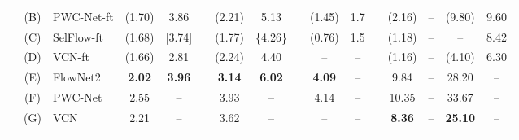 \documentclass[runningheads]{llncs}
\begin{document}
\begin{table}[t]
{\begin{tabular}{lcl cc c cc c cc c cccc}
        & \cellcolor{gray}(B) & \cellcolor{gray}PWC-Net-ft \cite{Sun2018PWCNet} & \cellcolor{gray}(1.70) & \cellcolor{gray}3.86 &\cellcolor{gray}& \cellcolor{gray}(2.21) & \cellcolor{gray}5.13 &\cellcolor{gray}& \cellcolor{gray}(1.45) & \cellcolor{gray}1.7 &\cellcolor{gray}& \cellcolor{gray}(2.16) & \cellcolor{gray}-- & \cellcolor{gray}(9.80) &\cellcolor{gray}9.60 \\
        & \cellcolor{gray}(C) & \cellcolor{gray}SelFlow-ft \cite{SelFlow} & \cellcolor{gray}(1.68) & \cellcolor{gray}[3.74] &\cellcolor{gray}& \cellcolor{gray}(1.77) & \cellcolor{gray}\{4.26\} &\cellcolor{gray}& \cellcolor{gray}(0.76) & \cellcolor{gray}1.5 &\cellcolor{gray}& \cellcolor{gray}(1.18) & \cellcolor{gray}-- & \cellcolor{gray}-- & \cellcolor{gray}8.42 \\ 
        & \cellcolor{gray}(D) & \cellcolor{gray}VCN-ft \cite{yang2019volumetric}  & \cellcolor{gray}(1.66) & \cellcolor{gray}2.81 &\cellcolor{gray}& \cellcolor{gray}(2.24) & \cellcolor{gray}4.40 &\cellcolor{gray}& \cellcolor{gray}-- & \cellcolor{gray}-- &\cellcolor{gray}& \cellcolor{gray}(1.16) & \cellcolor{gray}-- &  \cellcolor{gray}(4.10) & \cellcolor{gray}6.30 \\
        & (E)& FlowNet2 \cite{Flownet2} & {\bf 2.02} & {\bf 3.96} && {\bf 3.14} & {\bf 6.02} && {\bf 4.09} & -- && 9.84 & -- & 28.20 & -- \\
        & (F)& PWC-Net \cite{Sun2018PWCNet} & 2.55 & -- && 3.93 & -- && 4.14 & -- && 10.35 & -- & 33.67 & -- \\
        & (G)& VCN \cite{yang2019volumetric} & 2.21 & -- && 3.62 & -- && -- & -- && {\bf 8.36} & -- & {\bf 25.10} & -- \\
        \midrule
        \parbox[t]{2mm}{}

\end{tabular}}
\end{table}
\end{document}
